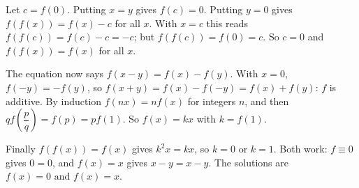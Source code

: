 Let $c=f(0)$. Putting $x=y$ gives $f(c)=0$. Putting $y=0$ gives $f(f(x))=f(x)-c$ for all $x$. With $x=c$ this reads $f(f(c))=f(c)-c=-c$; but $f(f(c))=f(0)=c$. So $c=0$ and $f(f(x))=f(x)$ for all $x$.

The equation now says $f(x-y)=f(x)-f(y)$. With $x=0$, $f(-y)=-f(y)$, so $f(x+y)=f(x)-f(-y)=f(x)+f(y)$: $f$ is additive. By induction $f(nx)=nf(x)$ for integers $n$, and then $qf\left(\dfrac pq\right)=f(p)=pf(1)$. So $f(x)=kx$ with $k=f(1)$.

Finally $f(f(x))=f(x)$ gives $k^2x=kx$, so $k=0$ or $k=1$. Both work: $f\equiv0$ gives $0=0$, and $f(x)=x$ gives $x-y=x-y$. The solutions are $\boxed{f(x)=0\text{ and }f(x)=x}$.
